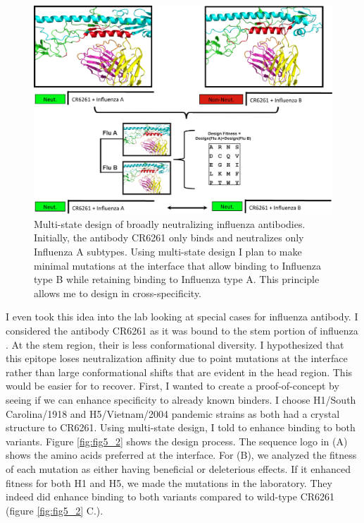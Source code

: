\begin{figure}[!t]
   \centering
   \includegraphics[width=.9\textwidth]{images/chapter5/figure5_1.pdf}
   \caption[Multi-State Design of Broadly Neutralizing Influenza Antibodies]{Multi-state design of broadly neutralizing influenza antibodies. Initially, the antibody CR6261 only binds and neutralizes only Influenza A subtypes. Using multi-state design I plan to make minimal mutations at the interface that allow binding to Influenza type B while retaining binding to Influenza type A. This principle allows me to design in cross-specificity.}
       \label{fig:fig5_1}
\end{figure}


I even took this idea into the lab looking at special cases for influenza antibody. I considered the antibody CR6261 as it was bound to the stem portion of influenza \citep{Corti:2011ku}. At the stem region, their is less conformational diversity. I hypothesized that this epitope loses neutralization affinity due to point mutations at the interface rather than large conformational shifts that are evident in the head region. This would be easier for \rosettadesign to recover. First, I wanted to create a proof-of-concept by seeing if we can enhance specificity to already known binders. I choose H1/South Carolina/1918 and H5/Vietnam/2004 pandemic strains as both had a crystal structure to CR6261. Using multi-state design, I told \rosettadesign to enhance binding to both variants. Figure \ref{fig:fig5_2} shows the design process. The sequence logo in (A) shows the amino acids preferred at the interface. For (B), we analyzed the fitness of each mutation as either having beneficial or deleterious effects. If it enhanced fitness for both H1 and H5, we made the mutations in the laboratory. They indeed did enhance binding to both variants compared to wild-type CR6261 (figure \ref{fig:fig5_2} C.).

